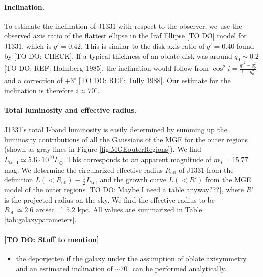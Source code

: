 \paragraph{Inclination.} To estimate the inclination of J1331 with respect to the observer, we use the observed axis ratio of the flattest ellipse in the Iraf Ellipse [TO DO] model for J1331, which is $q'=0.42$. This is similar to the disk axis ratio of $q' = 0.40$ found by \citet{SWELLSI} [TO DO: CHECK]. If a typical thickness of an oblate disk was around $q_0 \sim 0.2$ [TO DO: REF: Holmberg 1985], the inclination would follow from $\cos^2 i = \frac{q'^2 - q_0^2}{1 - q_0^2}$ and a correction of $+3^\circ$ [TO DO: REF: Tully 1988]. Our estimate for the inclination is therefore $i \approx 70^\circ$.

\paragraph{Total luminosity and effective radius.} J1331's total I-band luminosity is easily determined by summing up the luminosity contributions of all the Gaussians of the MGE for the outer regions (shown as gray lines in Figure \ref{fig:MGEouterRegions}). We find $L_\text{tot,I} \simeq 5.6 \cdot 10^{10} L_\odot$. This corresponds to an apparent magnitude of $m_I = 15.77$ mag. We determine the circularized effective radius $R_\text{eff}$ of J1331 from the definition $L(<R_\text{eff}) \equiv \frac 12 L_\text{tot}$ and the growth curve $L(<R')$ from the MGE model of the outer regions [TO DO: Maybe I need a table anyway???], where $R'$ is the projected radius on the sky. We find the effective radius to be $R_\text{eff} \simeq 2.6 \text{ arcsec } \hat{=} 5.2 \text{ kpc}$.  All values are summarized in Table \ref{tab:galaxyparameters}.



\paragraph{[TO DO: Stuff to mention]}
\begin{itemize}
\item the deporjecten if the galaxy under the assumption of oblate axisymmetry and an estimated inclination of $\sim70^\circ$ can be performed analytically.
\end{itemize}


